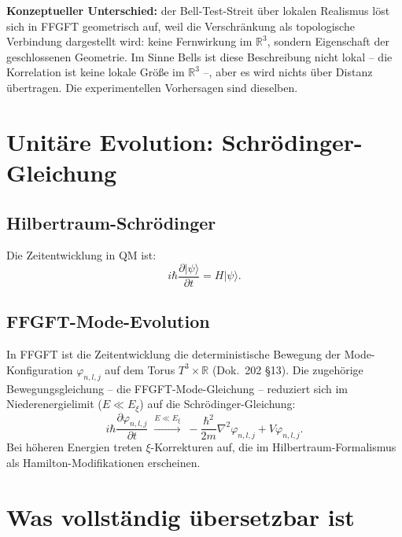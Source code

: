 \textbf{Konzeptueller Unterschied:} der Bell-Test-Streit über lokalen
Realismus löst sich in FFGFT geometrisch auf, weil die Verschränkung
als topologische Verbindung dargestellt wird: keine Fernwirkung im
$\mathbb{R}^3$, sondern Eigenschaft der geschlossenen Geometrie. Im
Sinne Bells ist diese Beschreibung nicht lokal -- die Korrelation ist
keine lokale Größe im $\mathbb{R}^3$ --, aber es wird nichts über
Distanz übertragen. Die experimentellen Vorhersagen sind dieselben.

\section{Unitäre Evolution: Schrödinger-Gleichung}

\subsection{Hilbertraum-Schrödinger}

Die Zeitentwicklung in QM ist:
\begin{equation}
  i\hbar \frac{\partial |\psi\rangle}{\partial t} = H |\psi\rangle.
\end{equation}

\subsection{FFGFT-Mode-Evolution}

In FFGFT ist die Zeitentwicklung die deterministische Bewegung der
Mode-Konfiguration $\varphi_{n,l,j}$ auf dem Torus
$T^3 \times \mathbb{R}$ (Dok.~202 §13). Die zugehörige
Bewegungsgleichung -- die FFGFT-Mode-Gleichung -- reduziert sich im
Niederenergielimit ($E \ll E_\xi$) auf die Schrödinger-Gleichung:
\begin{equation}
  i\hbar \frac{\partial \varphi_{n,l,j}}{\partial t}
  \;\xrightarrow{E \ll E_\xi}\;
  -\frac{\hbar^2}{2m}\nabla^2 \varphi_{n,l,j} + V \varphi_{n,l,j}.
\end{equation}
Bei höheren Energien treten $\xi$-Korrekturen auf, die im
Hilbertraum-Formalismus als Hamilton-Modifikationen erscheinen.

\section{Was vollständig übersetzbar ist}

